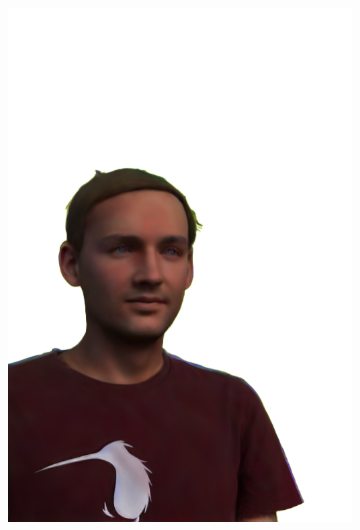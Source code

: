 \begin{figure}[ht]
\begin{subfigure}{0.08\linewidth}
        \includegraphics[width=\textwidth]{Figures/results/low/simon_3d/11_render.png}
	\end{subfigure}
    \begin{subfigure}{0.08\linewidth}%

\end{subfigure}
\end{figure}
